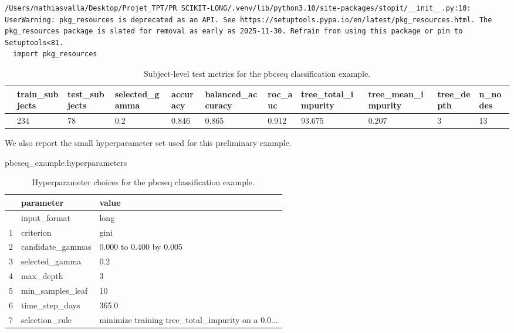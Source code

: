 \documentclass[
  letterpaper,
  DIV=11,
  numbers=noendperiod]{scrartcl}
\newenvironment{Shaded}{\begin{snugshade}}{\end{snugshade}}
\newcommand{\NormalTok}[1]{\textcolor[rgb]{0.00,0.23,0.31}{#1}}
\begin{document}
\begin{verbatim}
/Users/mathiasvalla/Desktop/Projet_TPT/PR SCIKIT-LONG/.venv/lib/python3.10/site-packages/stopit/__init__.py:10: UserWarning: pkg_resources is deprecated as an API. See https://setuptools.pypa.io/en/latest/pkg_resources.html. The pkg_resources package is slated for removal as early as 2025-11-30. Refrain from using this package or pin to Setuptools<81.
  import pkg_resources
\end{verbatim}

\begin{longtable}[]{@{}lllllllllll@{}}

\caption{\label{tbl-pbcseq-metrics}Subject-level test metrics for the
pbcseq classification example.}

\tabularnewline

\toprule\noalign{}
& train\_subjects & test\_subjects & selected\_gamma & accuracy &
balanced\_accuracy & roc\_auc & tree\_total\_impurity &
tree\_mean\_impurity & tree\_depth & n\_nodes \\
\midrule\noalign{}
\endhead
\bottomrule\noalign{}
\endlastfoot
0 & 234 & 78 & 0.2 & 0.846 & 0.865 & 0.912 & 93.675 & 0.207 & 3 & 13 \\

\end{longtable}

We also report the small hyperparameter set used for this preliminary
example.

\begin{Shaded}
\begin{Highlighting}[]
\NormalTok{pbcseq\_example.hyperparameters}
\end{Highlighting}
\end{Shaded}

\begin{longtable}[]{@{}lll@{}}

\caption{\label{tbl-pbcseq-hyperparameters}Hyperparameter choices for
the pbcseq classification example.}

\tabularnewline

\toprule\noalign{}
& parameter & value \\
\midrule\noalign{}
\endhead
\bottomrule\noalign{}
\endlastfoot
0 & input\_format & long \\
1 & criterion & gini \\
2 & candidate\_gammas & 0.000 to 0.400 by 0.005 \\
3 & selected\_gamma & 0.2 \\
4 & max\_depth & 3 \\
5 & min\_samples\_leaf & 10 \\
6 & time\_step\_days & 365.0 \\
7 & selection\_rule & minimize training tree\_total\_impurity on a
0.0... \\

\end{longtable}
\end{document}

